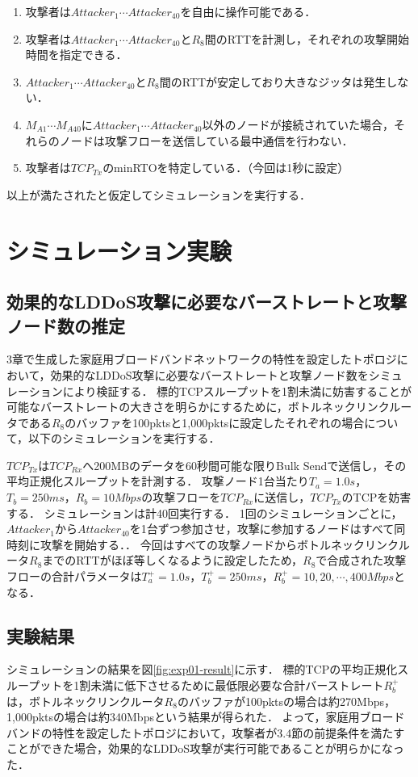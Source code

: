 \documentclass[Japanese]{dicomopapers}
\begin{document}
\begin{enumerate}
    \item 攻撃者は$Attacker_{1} \cdots Attacker_{40}$を自由に操作可能である．
    \item 攻撃者は$Attacker_{1} \cdots Attacker_{40}$と$R_{8}$間のRTTを計測し，それぞれの攻撃開始時間を指定できる．
    \item $Attacker_{1} \cdots Attacker_{40}$と$R_{8}$間のRTTが安定しており大きなジッタは発生しない．
    \item $M_{A1} \cdots M_{A40}$に$Attacker_{1} \cdots Attacker_{40}$以外のノードが接続されていた場合，それらのノードは攻撃フローを送信している最中通信を行わない．
    \item 攻撃者は$TCP_{Tx}$のminRTOを特定している．（今回は1秒に設定）
\end{enumerate}

以上が満たされたと仮定してシミュレーションを実行する．

\section{シミュレーション実験}
\subsection{効果的なLDDoS攻撃に必要なバーストレートと攻撃ノード数の推定}
3章で生成した家庭用ブロードバンドネットワークの特性を設定したトポロジにおいて，効果的なLDDoS攻撃に必要なバーストレートと攻撃ノード数をシミュレーションにより検証する．
標的TCPスループットを1割未満に妨害することが可能なバーストレートの大きさを明らかにするために，ボトルネックリンクルータである$R_{8}$のバッファを100pktsと1,000pktsに設定したそれぞれの場合について，以下のシミュレーションを実行する．

$TCP_{Tx}$は$TCP_{Rx}$へ200MBのデータを60秒間可能な限りBulk Sendで送信し，その平均正規化スループットを計測する．
攻撃ノード1台当たり$T_{a} = 1.0s$，$T_{b} = 250ms$，$R_{b}=10Mbps$の攻撃フローを$TCP_{Rx}$に送信し，$TCP_{Tx}$のTCPを妨害する．
シミュレーションは計40回実行する．
1回のシミュレーションごとに，$Attacker_{1}$から$Attacker_{40}$を1台ずつ参加させ，攻撃に参加するノードはすべて同時刻に攻撃を開始する．．
今回はすべての攻撃ノードからボトルネックリンクルータ$R_{8}$までのRTTがほぼ等しくなるように設定したため，$R_{8}$で合成された攻撃フローの合計パラメータは$T_{a}^+ = 1.0s$，$T_{b}^+ = 250ms$，$R_{b}^+=10, 20, \cdots, 400Mbps$となる．

\subsection{実験結果}
シミュレーションの結果を図\ref{fig:exp01-result}に示す．
標的TCPの平均正規化スループットを1割未満に低下させるために最低限必要な合計バーストレート$R_{b}^+$は，ボトルネックリンクルータ$R_{8}$のバッファが100pktsの場合は約270Mbps，1,000pktsの場合は約340Mbpsという結果が得られた．
よって，家庭用ブロードバンドの特性を設定したトポロジにおいて，攻撃者が3.4節の前提条件を満たすことができた場合，効果的なLDDoS攻撃が実行可能であることが明らかになった．
\end{document}
